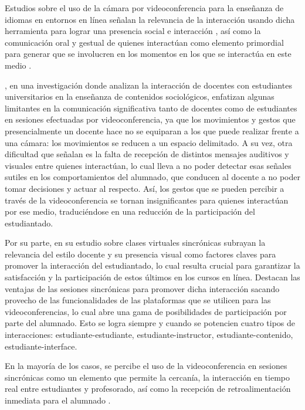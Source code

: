 \documentclass[spanish]{textolivre}
\begin{document}
Estudios sobre el uso de la cámara por videoconferencia para la enseñanza de idiomas en entornos en línea señalan la relevancia de la interacción usando dicha herramienta para lograr una presencia social e interacción \cite{codreanu_effects_2013,megha_tollefson_study_2016,delaus_influence_2016}, así como la comunicación oral y gestual de quienes interactúan como elemento primordial para generar que se involucren en los momentos en los que se interactúa en este medio \cite{satar_multimodal_2013}.

\textcite{charles_koeber_outside_2008}, en una investigación donde analizan la interacción de docentes con estudiantes universitarios en la enseñanza de contenidos sociológicos, enfatizan algunas limitantes en la comunicación significativa tanto de docentes como de estudiantes en sesiones efectuadas por videoconferencia, ya que los movimientos y gestos que presencialmente un docente hace no se equiparan a los que puede realizar frente a una cámara: los movimientos se reducen a un espacio delimitado. A su vez, otra dificultad que señalan es la falta de recepción de distintos mensajes auditivos y visuales entre quienes interactúan, lo cual lleva a no poder detectar esas señales sutiles en los comportamientos del alumnado, que conducen al docente a no poder tomar decisiones y actuar al respecto. Así, los gestos que se pueden percibir a través de la videoconferencia se tornan insignificantes para quienes interactúan por ese medio, traduciéndose en una reducción de la participación del estudiantado.

Por su parte, \textcite{martin_examining_2012} en su estudio sobre clases virtuales sincrónicas subrayan la relevancia del estilo docente y su presencia visual como factores claves para promover la interacción del estudiantado, lo cual resulta crucial para garantizar la satisfacción y la participación de estos últimos en los cursos en línea. Destacan las ventajas de las sesiones sincrónicas para promover dicha interacción sacando provecho de las funcionalidades de las plataformas que se utilicen para las videoconferencias, lo cual abre una gama de posibilidades de participación por parte del alumnado. Esto se logra siempre y cuando se potencien cuatro tipos de interacciones: estudiante-estudiante, estudiante-instructor, estudiante-contenido, estudiante-interface.

En la mayoría de los casos, se percibe el uso de la videoconferencia en sesiones sincrónicas como un elemento que permite la cercanía, la interacción en tiempo real entre estudiantes y profesorado, así como la recepción de retroalimentación inmediata para el alumnado \cite{delaus_influence_2016}.
\end{document}
